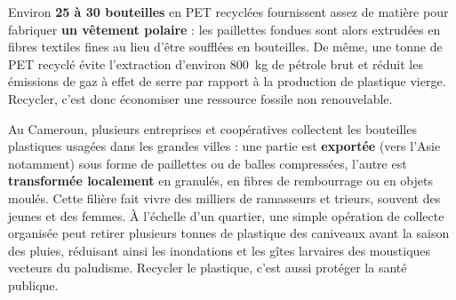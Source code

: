 \documentclass[11pt]{article}
\begin{document}
\begin{exemplebox}
Environ \textbf{25 à 30 bouteilles} en PET recyclées fournissent assez de matière pour fabriquer \textbf{un vêtement polaire} : les paillettes fondues sont alors extrudées en fibres textiles fines au lieu d'être soufflées en bouteilles. De même, une tonne de PET recyclé évite l'extraction d'environ \SI{800}{kg} de pétrole brut et réduit les émissions de gaz à effet de serre par rapport à la production de plastique vierge. Recycler, c'est donc économiser une ressource fossile non renouvelable.
\end{exemplebox}

\begin{savaistu}
Au Cameroun, plusieurs entreprises et coopératives collectent les bouteilles plastiques usagées dans les grandes villes : une partie est \textbf{exportée} (vers l'Asie notamment) sous forme de paillettes ou de balles compressées, l'autre est \textbf{transformée localement} en granulés, en fibres de rembourrage ou en objets moulés. Cette filière fait vivre des milliers de ramasseurs et trieurs, souvent des jeunes et des femmes. À l'échelle d'un quartier, une simple opération de collecte organisée peut retirer plusieurs tonnes de plastique des caniveaux avant la saison des pluies, réduisant ainsi les inondations et les gîtes larvaires des moustiques vecteurs du paludisme. Recycler le plastique, c'est aussi protéger la santé publique.
\end{savaistu}
\end{document}
